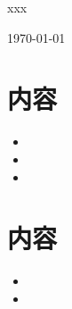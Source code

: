 \documentclass[a4paper,12pt]{ltjsarticle}
\begin{document}
  \centerline{\Large xxx}
  \centerline{\large \today}
  \section*{内容}
  \begin{itemize}[leftmargin=*,label={--}]
    \item 
    \item 
    \item 
  \end{itemize}

  \section*{内容}
  \begin{itemize}[leftmargin=*,label={$\square$}]
    \item 
    \item 
  \end{itemize}
\end{document}
